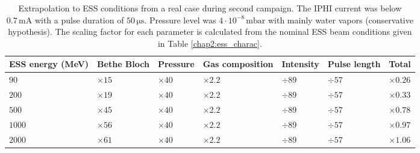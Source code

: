 \begin{table}[ht]
  \centering
  \caption[Extrapolation to ESS conditions from a real case during the second campaign]
  {Extrapolation to ESS conditions from a real case during second campaign.
    The IPHI current was below $0.7\,\mathrm{mA}$ with a pulse duration of $50\, \mathrm{\mu s}$. Pressure level was $4 \cdot 10^{-8}\,\mathrm{mbar}$ with mainly water vapors (conservative hypothesis).
    The scaling factor for each parameter is calculated from the nominal ESS beam conditions given in Table \ref{chap2:ess_charac}.}
  \label{chap4:extrapolationMCP}
  \begin{tabularx}{\linewidth}{XXXXXXX}
    \toprule    ESS energy (MeV) & Bethe Bloch & Pressure     & Gas composition & Intensity & Pulse length & Total         \\
    \midrule
    $ 90$                        & $\times 15$ & $\times 40 $ & $\times 2.2$    & $\div89$  & $\div57$     & $\times 0.26$ \\
    $ 200 $                      & $\times 19$ & $\times 40$  & $\times 2.2$    & $\div89$  & $\div57$     & $\times 0.33$ \\
    $500$                        & $\times 45$ & $\times 40$  & $\times 2.2$    & $\div89$  & $\div57$     & $\times 0.78$ \\
    $1000$                       & $\times 56$ & $\times 40$  & $\times 2.2$    & $\div89$  & $\div57$     & $\times 0.97$ \\
    $2000$                       & $\times 61$ & $\times 40$  & $\times 2.2$    & $\div89$  & $\div57$     & $\times 1.06$ \\
    \bottomrule
  \end{tabularx}
\end{table}